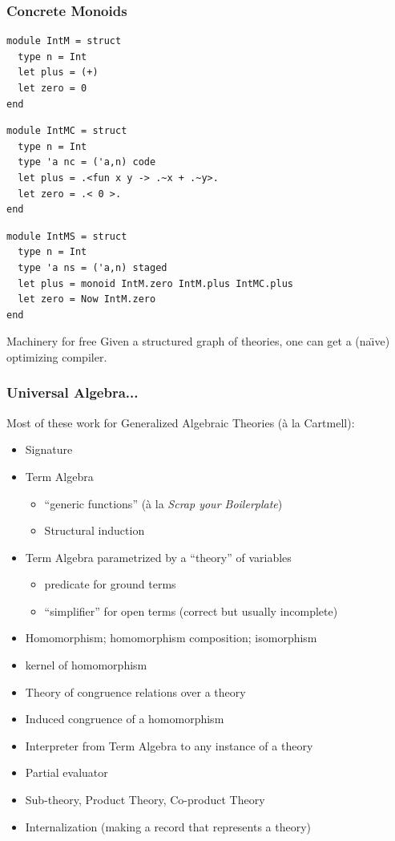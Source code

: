 \documentclass{beamer}
\newcommand{\sred}[1]{\textcolor{slidered}{#1}}
\begin{document}
\lstset{language=metaocaml,basicstyle=\scriptsize}
\begin{frame}[t,fragile]
\frametitle{Concrete Monoids}
\begin{minipage}{5.4cm}
\begin{lstlisting}
module IntM = struct
  type n = Int
  let plus = (+)
  let zero = 0
end
\end{lstlisting}
\end{minipage}
\begin{minipage}{5.4cm}
\begin{lstlisting}
module IntMC = struct
  type n = Int
  type 'a nc = ('a,n) code
  let plus = .<fun x y -> .~x + .~y>.
  let zero = .< 0 >.
end
\end{lstlisting}
\end{minipage}
\vspace*{.3cm}
\begin{lstlisting}
module IntMS = struct
  type n = Int
  type 'a ns = ('a,n) staged
  let plus = monoid IntM.zero IntM.plus IntMC.plus
  let zero = Now IntM.zero
end
\end{lstlisting}
\pause
\begin{block}{Machinery for free}
Given a structured graph of theories, one can get a (na\"{\i}ve)
optimizing compiler.
\end{block}
\end{frame}

\begin{frame}
\frametitle{Universal Algebra...}
Most of these work for Generalized Algebraic Theories (\`{a} la Cartmell):
\begin{itemize}
\item Signature
\item Term Algebra
\begin{itemize}
\item ``generic functions'' (\`{a} la \textit{Scrap your Boilerplate})
\item Structural induction
\end{itemize}
\item Term Algebra parametrized by a ``theory'' of variables
\begin{itemize}
\item predicate for ground terms
\item ``simplifier'' for open terms (correct but usually incomplete)
\end{itemize}
\item \sred{Homomorphism}; homomorphism composition; isomorphism
\item kernel of homomorphism
\item Theory of congruence relations over a theory
\item Induced congruence of a homomorphism 
\item Interpreter from Term Algebra to any instance of a theory
\item Partial evaluator
\item Sub-theory, Product Theory, Co-product Theory
\item Internalization (making a record that represents a theory)
\end{itemize}
\end{frame}
\end{document}
